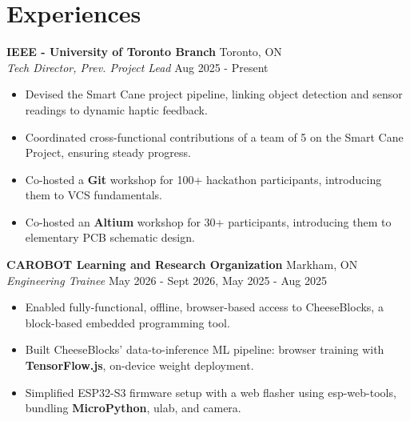 \documentclass[10pt,letterpaper]{article}
\begin{document}
\section{Experiences}

\textbf{IEEE - University of Toronto Branch} \hfill 
Toronto, ON \\
\textit{Tech Director, Prev. Project Lead} \hfill
Aug 2025 - Present \\
\begin{itemize}
\item Devised the Smart Cane project pipeline, linking object detection and sensor readings to dynamic haptic feedback. 
\item Coordinated cross-functional contributions of a team of 5 on the Smart Cane Project, ensuring steady progress. 
\item Co-hosted a \textbf{Git} workshop for 100+ hackathon participants, introducing them to VCS fundamentals.
\item Co-hosted an \textbf{Altium} workshop for 30+ participants, introducing them to elementary PCB schematic design.
\end{itemize}

\vspace*{0.5em}
\textbf{CAROBOT Learning and Research Organization} \hfill
Markham, ON \\
\textit{Engineering Trainee} \hfill 
May 2026 - Sept 2026, May 2025 - Aug 2025 \\
\begin{itemize}
    \item Enabled fully-functional, offline, browser-based access to CheeseBlocks, a block-based embedded programming tool.
    \item Built CheeseBlocks' data-to-inference ML pipeline: browser training with \textbf{TensorFlow.js}, on-device weight deployment.
    \item Simplified ESP32-S3 firmware setup with a web flasher using esp-web-tools, bundling \textbf{MicroPython}, ulab, and camera.
\end{itemize}
\end{document}

